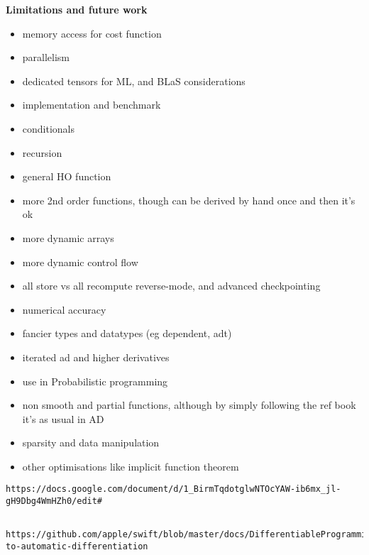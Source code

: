 \noindent \textbf{Limitations and future work}
\begin{itemize}
    \item memory access for cost function 
    \item parallelism
    \item dedicated tensors for ML, and BLaS considerations
    \item implementation and benchmark
    \item conditionals
    \item recursion
    \item general HO function
    \item more 2nd order functions, though can be derived by hand once and then it's ok
    \item more dynamic arrays
    \item more dynamic control flow
    \item all store vs all recompute reverse-mode, and advanced checkpointing
    \item numerical accuracy
    \item fancier types and datatypes (eg dependent, adt) 
    \item iterated ad and higher derivatives
    \item use in Probabilistic programming
    \item non smooth and partial functions, although by simply following the ref book it's as usual in AD
    \item sparsity and data manipulation
    \item other optimisations like implicit function theorem
\end{itemize}

\begin{verbatim}https://docs.google.com/document/d/1_BirmTqdotglwNTOcYAW-ib6mx_jl-gH9Dbg4WmHZh0/edit# \end{verbatim}
\begin{verbatim}
	https://github.com/apple/swift/blob/master/docs/DifferentiableProgramming.md#approaches-to-automatic-differentiation
\end{verbatim}


\clearpage